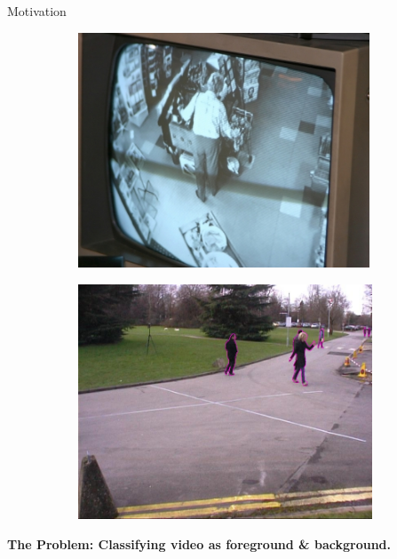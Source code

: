\documentclass[final]{beamer}
\begin{document}
\begin{frame}{}
\begin{textblock}{36}
\begin{block}{Motivation}

\begin{figure}
        \centering
        \begin{subfigure}[b]{0.4\textwidth}
                \centering
                \includegraphics[height=7cm]{cctv.jpg}
                \end{subfigure}%
        \begin{subfigure}[b]{0.4\textwidth}
                \centering
                \includegraphics[height=7cm]{fgSparse}
                \end{subfigure}
\end{figure}
\vspace{0.5cm}

\textcolor{likePurple}{\textbf{The Problem: Classifying video as foreground \& background.}}
\vspace{0.5cm}

\begin{itemize}


\end{itemize}
\end{block}
\end{textblock}
\end{frame}
\end{document}

